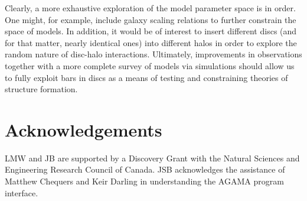Clearly, a more exhaustive exploration of the model parameter space is
in order.  One might, for example, include galaxy scaling relations to
further constrain the space of models.  In addition, it would be of
interest to insert different discs (and for that matter, nearly
identical ones) into different halos in order to explore the
random nature of disc-halo interactions.  Ultimately, improvements
in observations together with a more complete survey of models via
simulations should allow us to fully exploit bars in discs as a means
of testing and constraining theories of structure formation.

\section*{Acknowledgements}
{LMW and JB are supported by a Discovery Grant with the Natural
  Sciences and Engineering Research Council of Canada. JSB
  acknowledges the assistance of Matthew Chequers and Keir Darling in
  understanding the \textsc{AGAMA} program interface.}



